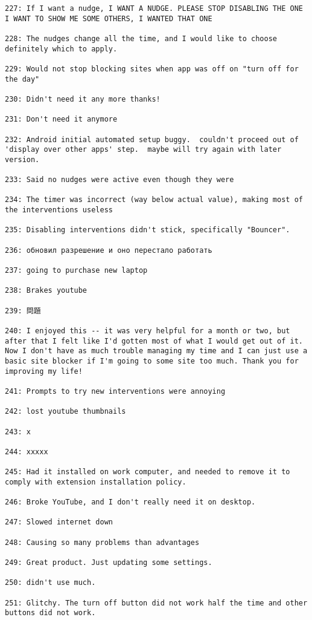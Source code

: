 \begin{lstlisting}[breaklines]
227: If I want a nudge, I WANT A NUDGE. PLEASE STOP DISABLING THE ONE I WANT TO SHOW ME SOME OTHERS, I WANTED THAT ONE

228: The nudges change all the time, and I would like to choose definitely which to apply.

229: Would not stop blocking sites when app was off on "turn off for the day"

230: Didn't need it any more thanks!

231: Don't need it anymore

232: Android initial automated setup buggy.  couldn't proceed out of 'display over other apps' step.  maybe will try again with later version.

233: Said no nudges were active even though they were

234: The timer was incorrect (way below actual value), making most of the interventions useless

235: Disabling interventions didn't stick, specifically "Bouncer".

236: обновил разрешение и оно перестало работать

237: going to purchase new laptop

238: Brakes youtube

239: 問題

240: I enjoyed this -- it was very helpful for a month or two, but after that I felt like I'd gotten most of what I would get out of it. Now I don't have as much trouble managing my time and I can just use a basic site blocker if I'm going to some site too much. Thank you for improving my life!

241: Prompts to try new interventions were annoying

242: lost youtube thumbnails

243: x

244: xxxxx

245: Had it installed on work computer, and needed to remove it to comply with extension installation policy.

246: Broke YouTube, and I don't really need it on desktop.

247: Slowed internet down

248: Causing so many problems than advantages

249: Great product. Just updating some settings.

250: didn't use much.

251: Glitchy. The turn off button did not work half the time and other buttons did not work.


\end{lstlisting}
